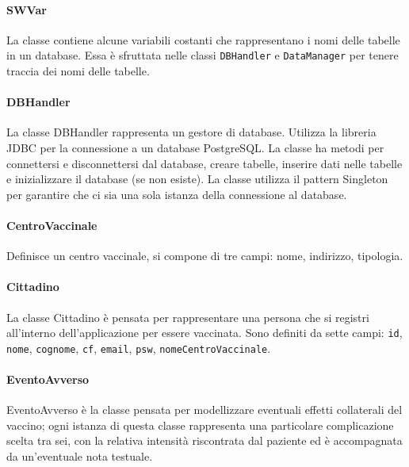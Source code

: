 	
	\paragraph{SWVar}
	La classe contiene alcune variabili costanti che rappresentano i nomi delle tabelle in un database.
	Essa è sfruttata nelle classi \verb|DBHandler| e \verb|DataManager| per tenere traccia dei nomi delle tabelle.
	
	
	\paragraph{DBHandler}
	La classe DBHandler rappresenta un gestore di database.
	Utilizza la libreria JDBC per la connessione a un database PostgreSQL.
	La classe ha metodi per connettersi e disconnettersi dal database, creare tabelle, inserire dati nelle tabelle e inizializzare il database (se non esiste).
	La classe utilizza il pattern Singleton per garantire che ci sia una sola istanza della connessione al database.
	
	
	\paragraph{CentroVaccinale}
	Definisce un centro vaccinale, si compone di tre campi: nome, indirizzo, tipologia.	
	
	
	\paragraph{Cittadino}
	La classe Cittadino è pensata per rappresentare una persona che si registri all’interno dell’applicazione per essere vaccinata.
	Sono definiti da sette campi: \verb|id|, \verb|nome|, \verb|cognome|, \verb|cf|, \verb|email|, \verb|psw|, \verb|nomeCentroVaccinale|.
	
	
	\paragraph{EventoAvverso}
	EventoAvverso è la classe pensata per modellizzare eventuali effetti collaterali del vaccino; ogni istanza di questa classe rappresenta una particolare complicazione scelta tra sei, con la relativa intensità riscontrata dal paziente ed è accompagnata da un'eventuale nota testuale.
	
	
